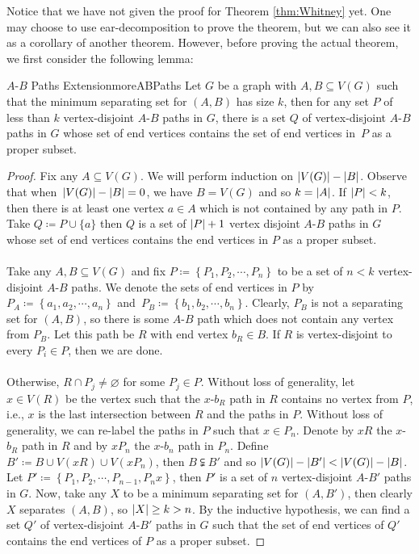 \documentclass[math]{amznotes}
\theoremstyle{remark}
\begin{document}
Notice that we have not given the proof for Theorem \ref{thm:Whitney} yet. One may choose to use ear-decomposition to prove the theorem, but we can also see it as a corollary of another theorem. However, before proving the actual theorem, we first consider the following lemma:
\begin{lembox}{$A$-$B$ Paths Extension}{moreABPaths}
    Let $G$ be a graph with $A, B \subseteq V(G)$ such that the minimum separating set for $(A, B)$ has size $k$, then for any set $P$ of less than $k$ vertex-disjoint $A$-$B$ paths in $G$, there is a set $Q$ of vertex-disjoint $A$-$B$ paths in $G$ whose set of end vertices contains the set of end vertices in~$P$ as a proper subset.
    \tcblower
    \begin{proof}
        Fix any $A \subseteq V(G)$. We will perform induction on ${\left\lvert {V(G)} \right\rvert} - {\left\lvert {B} \right\rvert}$. Observe that when~${\left\lvert {V(G)} \right\rvert} - {\left\lvert {B} \right\rvert} = 0$, we have $B = V(G)$ and so $k = {\left\lvert {A} \right\rvert}$. If ${\left\lvert {P} \right\rvert} < k$, then there is at least one vertex $a \in A$ which is not contained by any path in $P$. Take $Q \coloneqq P \cup \{a\}$ then $Q$ is a set of ${\left\lvert {P} \right\rvert} + 1$ vertex disjoint $A$-$B$ paths in $G$ whose set of end vertices contains the end vertices in $P$ as a proper subset.
        \\\\
        Take any $A, B \subseteq V(G)$ and fix $P \coloneqq \left\{P_1, P_2, \cdots, P_n\right\}$ to be a set of $n < k$ vertex-disjoint $A$-$B$ paths. We denote the sets of end vertices in $P$ by $P_A \coloneqq \left\{a_1, a_2, \cdots, a_n\right\}$ and~$P_B \coloneqq \left\{b_1, b_2, \cdots, b_n\right\}$. Clearly, $P_B$ is not a separating set for $(A, B)$, so there is some $A$-$B$ path which does not contain any vertex from $P_B$. Let this path be $R$ with end vertex $b_R \in B$. If $R$ is vertex-disjoint to every $P_i \in P$, then we are done.
        \\\\
        Otherwise, $R \cap P_j \neq \varnothing$ for some $P_j \in P$. Without loss of generality, let $x \in V(R)$ be the vertex such that the $x$-$b_R$ path in $R$ contains no vertex from $P$, i.e., $x$ is the last intersection between $R$ and the paths in $P$. Without loss of generality, we can re-label the paths in $P$ such that $x \in P_n$. Denote by $xR$ the $x$-$b_R$ path in $R$ and by $xP_n$ the $x$-$b_n$ path in $P_n$. Define $B' \coloneqq B \cup V(xR) \cup V(xP_n)$, then $B \subsetneqq B'$ and so ${\left\lvert {V(G)} \right\rvert} - {\left\lvert {B'} \right\rvert} < {\left\lvert {V(G)} \right\rvert} - {\left\lvert {B} \right\rvert}$. Let $P' \coloneqq \left\{P_1, P_2, \cdots, P_{n - 1}, P_nx\right\}$, then $P'$ is a set of $n$ vertex-disjoint $A$-$B'$ paths in $G$. Now, take any $X$ to be a minimum separating set for $(A, B')$, then clearly $X$ separates $(A, B)$, so ${\left\lvert {X} \right\rvert} \geq k > n$. By the inductive hypothesis, we can find a set $Q'$ of vertex-disjoint $A$-$B'$ paths in $G$ such that the set of end vertices of $Q'$ contains the end vertices of $P$ as a proper subset.

\end{proof}
\end{lembox}
\end{document}

